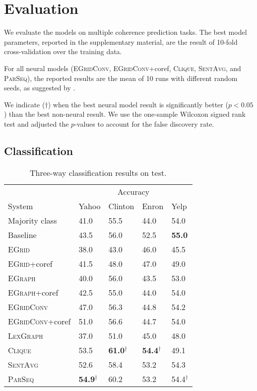 \documentclass[11pt,a4paper]{article}
\newcommand \egrid{\textsc{EGrid}\xspace}
\newcommand \egraph{\textsc{EGraph}\xspace}
\newcommand \lexgraph{\textsc{LexGraph}\xspace}
\newcommand \parseq{\textsc{ParSeq}\xspace}
\newcommand \clique{\textsc{Clique}\xspace}
\newcommand \sentavg{\textsc{SentAvg}\xspace}
\newcommand \egridconv{\textsc{EGridConv}\xspace}
\begin{document}
\section{Evaluation}
\label{sec:eval}

We evaluate the models on multiple coherence prediction tasks. The best model parameters, reported in the supplementary material, are the result of 10-fold cross-validation over the training data.

For all neural models (\egridconv, \egridconv+coref, \clique, \sentavg, and \parseq), the reported results are the mean of 10 runs with different random seeds, as suggested by \citet{reimers-gurevych:2017}.

We indicate ($\dag$) when the best neural model result is significantly better ($p < 0.05$) than the best non-neural result. We use the one-sample Wilcoxon signed rank test and adjusted the $p$-values to account for the false discovery rate. 

\subsection{Classification}
\label{sec:classification}

\begin{table}\begin{center}
 \begin{small}
\begin{tabular}{@{}lllll@{}}
	\toprule
    & \multicolumn{4}{c}{Accuracy} \\
	System & Yahoo & Clinton & Enron & Yelp \\	
	\midrule
    Majority class & 41.0 & 55.5 & 44.0 & 54.0 \\
    Baseline & 43.5 & 56.0 & 52.5 & \textbf{55.0} \\ 
    \midrule
	\egrid & 38.0 & 43.0 & 46.0 & 45.5 \\
    \egrid +coref & 41.5 & 48.0 & 47.0 & 49.0 \\
    \egraph & 40.0 & 56.0 & 43.5 & 53.0 \\
    \egraph +coref & 42.5 & 55.0 & 44.0 & 54.0 \\
	\egridconv & 47.0 & 56.3 & 44.8 & 54.2 \\
\egridconv +coref & 51.0 & 56.6 & 44.7 & 54.0 \\
\midrule
    \lexgraph & 37.0 & 51.0 & 45.0 & 48.0 \\ 
    \midrule
    \clique & 53.5 & \textbf{61.0}$^{\dag}$ & \textbf{54.4}$^{\dag}$ & 49.1 \\
\sentavg & 52.6 & 58.4 & 53.2 & 54.3 \\
\parseq & \textbf{54.9}$^{\dag}$ & 60.2 & 53.2 & 54.4$^{\dag}$ \\	
\bottomrule
\end{tabular}
 \end{small}
\caption{Three-way classification results on test. 
}
\label{tab:3class_test_appen}
\end{center}
\end{table}
\end{document}

